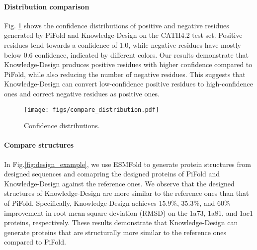 \documentclass{article}
\begin{document}
\begin{minipage}{\linewidth}
   \begin{minipage}{0.57\linewidth}
      \paragraph{Distribution comparison} Fig. \ref{fig:compare_distribution} shows the confidence distributions of positive and negative residues generated by PiFold and Knowledge-Design on the CATH4.2 test set. Positive residues tend towards a confidence of 1.0, while negative residues have mostly below 0.6 confidence, indicated by different colors. Our results demonstrate that Knowledge-Design produces positive residues with higher confidence compared to PiFold, while also reducing the number of negative residues. This suggests that Knowledge-Design can convert low-confidence positive residues to high-confidence ones and correct negative residues as positive ones. 
   \end{minipage}
   \hspace{0.00\linewidth}
   \begin{minipage}{0.43\linewidth}
      \begin{figure}[H]
         \centering
         \texttt{[image: figs/compare\_distribution.pdf]}
         \caption{Confidence distributions. }
         \label{fig:compare_distribution}
      \end{figure}
   \end{minipage}
\end{minipage}




\vspace{-3mm}
\paragraph{Compare structures} In Fig.\ref{fig:design_example}, we use ESMFold\citep{lin2022language} to generate protein structures from designed sequences and comapring the designed proteins of PiFold and Knowledge-Design against the reference ones.  We observe that the designed structures of Knowledge-Design are more similar to the reference ones than that of PiFold. Specifically, Knowledge-Design achieves 15.9\%, 35.3\%, and 60\% improvement in root mean square deviation (RMSD) on the 1a73, 1a81, and 1ac1 proteins, respectively. These results demonstrate that Knowledge-Design can generate proteins that are structurally more similar to the reference ones compared to PiFold.
\end{document}

